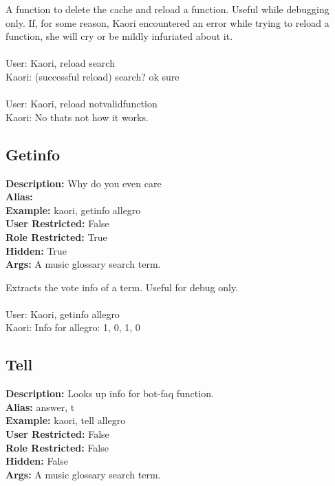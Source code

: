\documentclass[11pt]{article}
\begin{document}
A function to delete the cache and reload a function. Useful while debugging only. If, for some reason, Kaori encountered an error while trying to reload a function, she will cry or be mildly infuriated about it.
\\ \\
User: Kaori, reload search
\\
Kaori: (successful reload) search? ok sure
\\ \\
User: Kaori, reload notvalidfunction
\\ 
Kaori: No thats not how it works.

\subsection{Getinfo}
\textbf{Description: } \hspace{5pt} Why do you even care \\
\textbf{Alias: } \hspace{5pt} \\
\textbf{Example: } \hspace{5pt} kaori, getinfo allegro \\
\textbf{User Restricted: } \hspace{5pt} False\\
\textbf{Role Restricted: } \hspace{5pt} True\\
\textbf{Hidden: } \hspace{5pt} True\\
\textbf{Args: } \hspace{5pt} A music glossary search term.

Extracts the vote info of a term. Useful for debug only.
\\ \\
User: Kaori, getinfo allegro
\\ 
Kaori: Info for allegro: 1, 0, 1, 0

\subsection{Tell}
\textbf{Description: } \hspace{5pt} Looks up info for bot-faq function. \\
\textbf{Alias: } \hspace{5pt} answer, t \\
\textbf{Example: } \hspace{5pt} kaori, tell allegro \\
\textbf{User Restricted: } \hspace{5pt} False\\
\textbf{Role Restricted: } \hspace{5pt} False\\
\textbf{Hidden: } \hspace{5pt} False\\
\textbf{Args: } \hspace{5pt} A music glossary search term.
\end{document}
